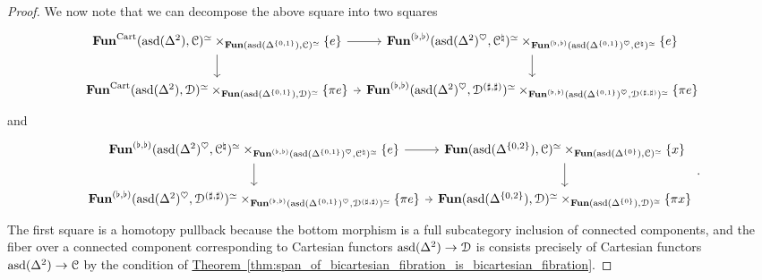 \documentclass[main.tex]{subfiles}
\begin{document}
\begin{proof}
  We now note that we can decompose the above square into two squares
  \begin{equation*}
    \begin{tikzcd}[column sep=tiny]
      \Fun^{\Cart}(\asd(\Delta^{2}), \category{C})^{\simeq} \times_{\Fun(\asd(\Delta^{\{0, 1\}}), \category{C})^{\simeq}} \{e\}
      \arrow[r]
      \arrow[d]
      & \Fun^{(\flat, \flat)}(\asd(\Delta^{2})^{\heartsuit}, \category{C}^{\natural})^{\simeq} \times_{\Fun^{(\flat, \flat)}(\asd(\Delta^{\{0, 1\}})^{\heartsuit}, \category{C}^{\natural})^{\simeq}} \{e\}
      \arrow[d]
      \\
      \Fun^{\Cart}(\asd(\Delta^{2}), \category{D})^{\simeq} \times_{\Fun(\asd(\Delta^{\{0, 1\}}), \category{D})^{\simeq}} \{\pi e\}
      \arrow[r]
      & \Fun^{(\flat, \flat)}(\asd(\Delta^{2})^{\heartsuit}, \category{D}^{(\sharp, \sharp)})^{\simeq} \times_{\Fun^{(\flat, \flat)}(\asd(\Delta^{\{0, 1\}})^{\heartsuit}, \category{D}^{(\sharp, \sharp)})^{\simeq}} \{\pi e\}
    \end{tikzcd}
  \end{equation*}
  and
  \begin{equation*}
    \begin{tikzcd}[column sep=tiny]
      \Fun^{(\flat, \flat)}(\asd(\Delta^{2})^{\heartsuit}, \category{C}^{\natural})^{\simeq} \times_{\Fun^{(\flat, \flat)}(\asd(\Delta^{\{0, 1\}})^{\heartsuit}, \category{C}^{\natural})^{\simeq}} \{e\}
      \arrow[r]
      \arrow[d]
      & \Fun(\asd(\Delta^{\{0, 2\}}), \category{C})^{\simeq} \times_{\Fun(\asd(\Delta^{\{0\}}), \category{C})^{\simeq}} \{x\}
      \arrow[d]
      \\
      \Fun^{(\flat, \flat)}(\asd(\Delta^{2})^{\heartsuit}, \category{D}^{(\sharp, \sharp)})^{\simeq} \times_{\Fun^{(\flat, \flat)}(\asd(\Delta^{\{0, 1\}})^{\heartsuit}, \category{D}^{(\sharp, \sharp)})^{\simeq}} \{\pi e\}
      \arrow[r]
      & \Fun(\asd(\Delta^{\{0, 2\}}), \category{D})^{\simeq} \times_{\Fun(\asd(\Delta^{\{0\}}), \category{D})^{\simeq}} \{\pi x\}
    \end{tikzcd}.
  \end{equation*}
  The first square is a homotopy pullback because the bottom morphism is a full subcategory inclusion of connected components, and the fiber over a connected component corresponding to Cartesian functors $\mathrm{asd}(\Delta^{2}) \to \mathcal{D}$ is consists precisely of Cartesian functors $\mathrm{asd}(\Delta^{2}) \to \mathcal{C}$ by the condition of \hyperref[thm:span_of_bicartesian_fibration_is_bicartesian_fibration]{Theorem~\ref*{thm:span_of_bicartesian_fibration_is_bicartesian_fibration}}.


\end{proof}
\end{document}
